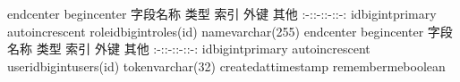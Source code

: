{}\markdownRendererBackslash{}end\markdownRendererLeftBrace{}center\markdownRendererRightBrace{}\markdownRendererInterblockSeparator
{}\markdownRendererInterblockSeparator
{}\markdownRendererBackslash{}begin\markdownRendererLeftBrace{}center\markdownRendererRightBrace{}\markdownRendererInterblockSeparator
{}\markdownRendererPipe{} 字段名称 \markdownRendererPipe{} 类型 \markdownRendererPipe{} 索引 \markdownRendererPipe{} 外键 \markdownRendererPipe{} 其他 \markdownRendererPipe{} \markdownRendererPipe{}:-:\markdownRendererPipe{}:-:\markdownRendererPipe{}:-:\markdownRendererPipe{}:-:\markdownRendererPipe{} \markdownRendererPipe{}id\markdownRendererPipe{}bigint\markdownRendererPipe{}primary\markdownRendererPipe{}\markdownRendererPipe{} auto\markdownRendererBackslash{}\markdownRendererUnderscore{}increscent\markdownRendererPipe{} \markdownRendererPipe{}role\markdownRendererBackslash{}\markdownRendererUnderscore{}id\markdownRendererPipe{}bigint\markdownRendererPipe{}\markdownRendererPipe{}roles(id)\markdownRendererPipe{}\markdownRendererPipe{} \markdownRendererPipe{}name\markdownRendererPipe{}varchar(255)\markdownRendererPipe{}\markdownRendererPipe{}\markdownRendererPipe{}\markdownRendererPipe{}\markdownRendererInterblockSeparator
{}\markdownRendererBackslash{}end\markdownRendererLeftBrace{}center\markdownRendererRightBrace{}\markdownRendererInterblockSeparator
{}\markdownRendererInterblockSeparator
{}\markdownRendererBackslash{}begin\markdownRendererLeftBrace{}center\markdownRendererRightBrace{}\markdownRendererInterblockSeparator
{}\markdownRendererPipe{} 字段名称 \markdownRendererPipe{} 类型 \markdownRendererPipe{} 索引 \markdownRendererPipe{} 外键 \markdownRendererPipe{} 其他 \markdownRendererPipe{} \markdownRendererPipe{}:-:\markdownRendererPipe{}:-:\markdownRendererPipe{}:-:\markdownRendererPipe{}:-:\markdownRendererPipe{} \markdownRendererPipe{}id\markdownRendererPipe{}bigint\markdownRendererPipe{}primary\markdownRendererPipe{}\markdownRendererPipe{} auto\markdownRendererBackslash{}\markdownRendererUnderscore{}increscent\markdownRendererPipe{} \markdownRendererPipe{}user\markdownRendererBackslash{}\markdownRendererUnderscore{}id\markdownRendererPipe{}bigint\markdownRendererPipe{}\markdownRendererPipe{}users(id)\markdownRendererPipe{}\markdownRendererPipe{} \markdownRendererPipe{}token\markdownRendererPipe{}varchar(32)\markdownRendererPipe{}\markdownRendererPipe{}\markdownRendererPipe{}\markdownRendererPipe{} \markdownRendererPipe{}created\markdownRendererBackslash{}\markdownRendererUnderscore{}at\markdownRendererPipe{}timestamp\markdownRendererPipe{}\markdownRendererPipe{}\markdownRendererPipe{}\markdownRendererPipe{} \markdownRendererPipe{}remember\markdownRendererBackslash{}\markdownRendererUnderscore{}me\markdownRendererPipe{}boolean\markdownRendererPipe{}\markdownRendererPipe{}\markdownRendererPipe{}\markdownRendererPipe{}\markdownRendererInterblockSeparator
